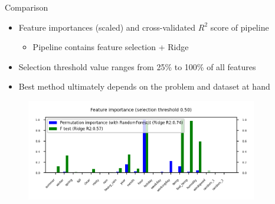 \begin{frame}[allowframebreaks]{Comparison}
\begin{itemize}
    \item Feature importances (scaled) and cross-validated \( R^2 \) score of pipeline
    \begin{itemize}
        \item Pipeline contains feature selection + Ridge
    \end{itemize}
    \item Selection threshold value ranges from 25\% to 100\% of all features
    \item Best method ultimately depends on the problem and dataset at hand
\end{itemize}

\begin{figure}
    \centering
    \includegraphics[width=0.9\textwidth]{images/pre-processing/comparison.png}
\end{figure}
\end{frame}









